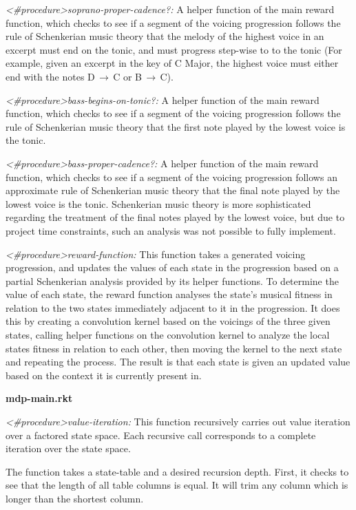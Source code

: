 \documentclass{chi2009}
\begin{document}
\textit{\textless\#procedure\textgreater soprano-proper-cadence?:} A helper function of the main reward function, which checks to see if a segment of the voicing progression follows the rule of Schenkerian music theory that the melody of the highest voice in an excerpt must end on the tonic, and must progress step-wise to to the tonic (For example, given an excerpt in the key of C Major, the highest voice must either end with the notes D$\,\to\,$C or B$\,\to\,$C).  

\textit{\textless\#procedure\textgreater bass-begins-on-tonic?:} A helper function of the main reward function, which checks to see if a segment of the voicing progression follows the rule of Schenkerian music theory that the first note played by the lowest voice is the tonic. 

\textit{\textless\#procedure\textgreater bass-proper-cadence?:} A helper function of the main reward function, which checks to see if a segment of the voicing progression follows an approximate rule of Schenkerian music theory that the final note played by the lowest voice is the tonic.  Schenkerian music theory is more sophisticated regarding the treatment of the final notes played by the lowest voice, but due to project time constraints, such an analysis was not possible to fully implement.

\textit{\textless\#procedure\textgreater reward-function:}  This function takes a generated voicing progression, and updates the values of each state in the progression based on a partial Schenkerian analysis provided by its helper functions.  To determine the value of each state, the reward function analyses the state's musical fitness in relation to the two states immediately adjacent to it in the progression.  It does this by creating a convolution kernel based on the voicings of the three given states, calling helper functions on the convolution kernel to analyze the local states fitness in relation to each other, then moving the kernel to the next state and repeating the process.  The result is that each state is given an updated value based on the context it is currently present in.


\textbf{mdp-main.rkt}

\textit{\textless\#procedure\textgreater value-iteration:}  This function recursively carries out value iteration over a factored state space.  Each recursive call corresponds to a complete iteration over the state space.  

The function takes a state-table and a desired recursion depth.  First, it checks to see that the length of all table columns is equal.  It will trim any column which is longer than the shortest column.  
\end{document}
